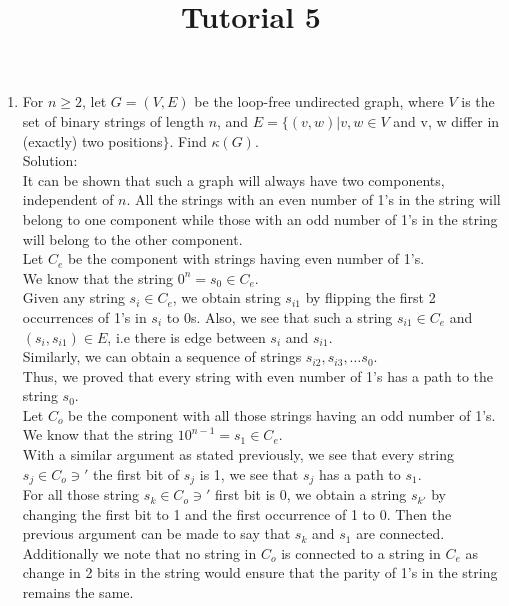 \documentclass[a4paper]{article}
\title{Tutorial 5}
\date{\displaydate{date}}
\begin{document}
\maketitle

\begin{enumerate}
\item For $n \geq 2$, let $G = (V, E)$ be the loop-free undirected graph, where $V$ is the set of binary strings of length $n$, and $E = \{(v, w)| v, w \in V$ and v, w differ in (exactly) two
positions$\}$. Find $\kappa (G)$. \\

Solution: \\
It can be shown that such a graph will always have two components, independent of $n$. All the strings with an even number of 1's in the string will belong to one component while those with an odd number of 1's in the string will belong to the other component. \\
Let $C_e$ be the component with strings having even number of 1's. \\
We know that the string $0^n = s_0 \in C_e$. \\
Given any string $s_i \in C_e$, we obtain string $s_{i1}$ by flipping the first 2 occurrences of 1's in $s_i$ to 0s. Also, we see that such a string $s_{i1} \in C_e$ and $(s_i, s_{i1}) \in E$, i.e there is edge between $s_i$ and $s_{i1}$. \\ 
Similarly, we can obtain a sequence of strings $s_{i2}, s_{i3}, \dots s_0$. \\
Thus, we proved that every string with even number of 1's has a path to the string $s_0$.\\

Let $C_o$ be the component with all those strings having an odd number of 1's. \\
We know that the string $10^{n-1} = s_1 \in C_e$. \\
With a similar argument as stated previously, we see that every string $s_j \in C_o \ni '$ the first bit of $s_j$ is 1, we see that $s_j$ has a path to $s_1$. \\
For all those string $s_k \in C_o \ni '$ first bit is 0, we obtain a string $s_{k'}$ by changing the first bit to 1 and the first occurrence of 1 to 0. Then the previous argument can be made to say that $s_k$ and $s_1$ are connected. \\
Additionally we note that no string in $C_o$ is connected to a string in $C_e$ as change in 2 bits in the string would ensure that the parity of 1's in the string remains the same.\\


\end{enumerate}
\end{document}
